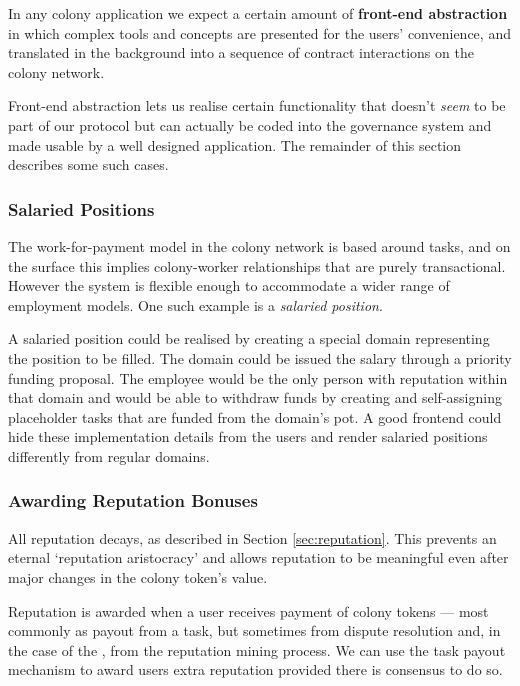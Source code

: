 In any colony application we expect a certain amount of \textbf{front-end abstraction} in which complex tools and concepts are presented for the users' convenience, and translated in the background into a sequence of contract interactions on the colony network.

Front-end abstraction lets us realise certain functionality that doesn't \emph{seem} to be part of our protocol but can actually be coded into the governance system and made usable by a well designed application. The remainder of this section describes some such cases.
%

\subsubsection{Salaried Positions}\label{sec:salary}

The work-for-payment model in the colony network is based around tasks, and on the surface this implies colony-worker relationships that are purely transactional. However the system is flexible enough to accommodate a wider range of employment models. One such example is a \emph{salaried position}.

A salaried position could be realised by creating a special domain representing the position to be filled. The domain could be issued the salary through a priority funding proposal. The employee would be the only person with reputation within that domain and would be able to withdraw funds by creating and self-assigning placeholder tasks that are funded from the domain's pot. A good frontend could hide these implementation details from the users and render salaried positions differently from regular domains.

\subsubsection{Awarding Reputation Bonuses}

All reputation decays, as described in Section \ref{sec:reputation}. This prevents an eternal `reputation aristocracy' and allows reputation to be meaningful even after major changes in the colony token's value. 

Reputation is awarded when a user receives payment of colony tokens --- most commonly as payout from a task, but sometimes from dispute resolution and, in the case of the \rc, from the reputation mining process. We can use the task payout mechanism to award users extra reputation provided there is consensus to do so. 

